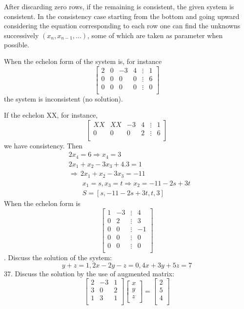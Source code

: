 \documentclass[11pt]{amsbook}
\begin{document}
After discarding zero rows, if the remaining is consistent, the given system is consistent. In the consistency case starting from the bottom and going upward considering the equation corresponding to each row one can find the unknowns successively $(x_{n},  x_{n-1}, ... )$, some of which are taken as parameter when possible.\par
When the echelon form of the system is, for instance
\[
 \begin{bmatrix}
    2 & 0 & -3 &  4 & \vdots & 1 \\
    0 & 0 & 0 &  0 & \vdots & 6 \\
    0 & 0 & 0 &  0 & \vdots & 0 \\
\end{bmatrix}
\]
the system is inconsistent (no solution). \par
If the echelon XX, for instance,
\[
 \begin{bmatrix}
    XX  & XX & -3 &  4 & \vdots & 1 \\
    0 & 0 & 0 & 2 & \vdots & 6 \\
\end{bmatrix}
\]
we have consistency. Then
\begin{align*}
&2x_{4} = 6 \Rightarrow x_{4} = 3 \\
&2x_{1} + x_{2} - 3x_{3} + 4.3 = 1 \\
&\Rightarrow \, 2x_{1} + x_{2} - 3x_{3} = -11 \\
&\qquad x_{1} = s, x_{3} = t \Rightarrow  x_{2} = -11 -2s + 3t \\
&\qquad S = [s, -11 - 2s + 3t, t, 3]
\end{align*}
When the echelon form is
\[
 \begin{bmatrix}
 1 & -3 & \vdots & 4 \\
 0 & 2 & \vdots & 3 \\
 0 & 0 & \vdots & -1 \\
 0 & 0 & \vdots & 0 \\
 0 & 0 & \vdots & 0 \\
\end{bmatrix}
\]
. Discuss the solution of the system:
\[
    y + z = 1,  2x -2y -z = 0,  4x + 3y +5z = 7
\]
37. Discuss the solution by the use of augmented matrix:
\[
 \begin{bmatrix}
    2  & -3 &  1 \\
    3  & 0 &  2 \\
    1  & 3 &  1 \\
\end{bmatrix} 
 \begin{bmatrix}
    x  \\
    y  \\
    z  \\
\end{bmatrix}
=
\begin{bmatrix}
    2  \\
    5  \\
    4  \\
\end{bmatrix}
\]
\end{document}
